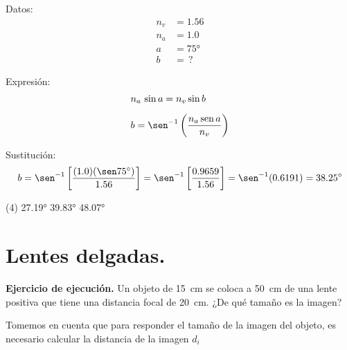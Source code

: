 \documentclass[12pt, letter]{exam}
\begin{document}
\begin{questions}
    \begin{minipage}[t]{0.35\linewidth}
    Datos: 
    \begin{align*}
    n_{v} &= 1.56 \\
    n_{a} &= 1.0 \\
    a &= \ang{75} \\
    b &= \, ?
    \end{align*}
    \end{minipage}
    \hspace{1cm}
    \begin{minipage}[t]{0.4\linewidth}
    Expresión:
    \begin{align*}
    &n_{a} \, \sin a = n_{v} \sin b \\[0.5em]
    &b = \sen^{-1} \left(\dfrac{n_{a} \, \text{sen} \, a}{n_{v}} \right)
    \end{align*}
    \end{minipage}

    Sustitución:
    \begin{align*}
    b = \sen^{-1} \left[ \dfrac{(1.0)(\sen \ang{75})}{1.56} \right] = \sen^{-1} \left[ \dfrac{0.9659}{1.56} \right] = \sen^{-1} (0.6191) = \ang{38.25}
    \end{align*}

    \vspace{0.4cm}
    \begin{tasks}(4)
        \task {}
        \task \ang{27.19}
        \task \ang{39.83}
        \task \ang{48.07}
    \end{tasks}

    \setcounter{section}{6}
    \section{Lentes delgadas.}

    \setcounter{question}{18} \question \textbf{Ejercicio de ejecución. } Un objeto de \SI{15}{\centi\meter} se coloca a \SI{50}{\centi\meter} de una lente positiva que tiene una distancia focal de \SI{20}{\centi\meter}. ¿De qué tamaño es la imagen?
    
    Tomemos en cuenta que para responder el tamaño de la imagen del objeto, es necesario calcular la distancia de la imagen $d_{i}$


\end{questions}
\end{document}
